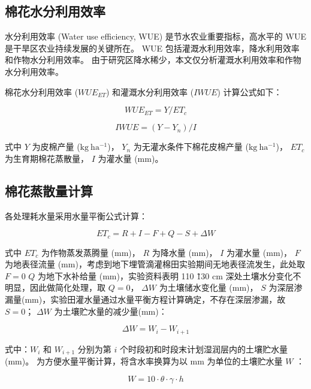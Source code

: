 \subsection{棉花水分利用效率}
水分利用效率 (Water use efficiency, WUE) 是节水农业重要指标，高水平的 WUE 是干旱区农业持续发展的关键所在。
WUE 包括灌溉水利用效率，降水利用效率和作物水分利用效率。
由于研究区降水稀少，本文仅分析灌溉水利用效率和作物水分利用效率。

棉花水分利用效率 ($WUE_{ET}$) 和灌溉水分利用效率 ($IWUE$) 计算公式如下：

\begin{equation}
    WUE_{ET} = Y / ET_c
\end{equation}

\begin{equation}
    IWUE = (Y - Y_n) / I
\end{equation}

式中 $Y$ 为皮棉产量 ($\mathrm{kg\ ha^{-1}}$)，
$Y_n$ 为无灌水条件下棉花皮棉产量 ($\mathrm{kg\ ha^{-1}}$)，
$ET_c$ 为生育期棉花蒸散量，
$I$ 为灌水量 (mm)。
\subsection{棉花蒸散量计算}

各处理耗水量采用水量平衡公式计算：

\begin{equation}
    ET_c = R + I - F + Q - S + \Delta W
\end{equation}

式中 $ET_c$ 为作物蒸发蒸腾量 (mm)，
$R$ 为降水量 (mm)，
$I$ 为灌水量 (mm)，
$F$ 为地表径流量 (mm)，考虑到地下埋管滴灌棉田实验期间无地表径流发生，此处取 $F = 0$
$Q$ 为地下水补给量 (mm)，实验资料表明 110 \~ 130 cm 深处土壤水分变化不明显，因此做简化处理，取 $Q = 0$，
$\Delta W$ 为土壤储水变化量 (mm)，
$S$ 为深层渗漏量(mm)，实验田灌水量通过水量平衡方程计算确定，不存在深层渗漏，故 $S=0$；
$\Delta W$ 为土壤贮水量的减少量(mm)：

\begin{equation}
    \Delta W = W_i - W_{i+1}
\end{equation}

式中：$W_i$ 和 $W_{i+1}$ 分别为第 $i$ 个时段初和时段末计划湿润层内的土壤贮水量 (mm)。
为方便水量平衡计算，将含水率换算为以 mm 为单位的土壤贮水量 $W$ ：

\begin{equation}
    W = 10 \cdot \theta \cdot \gamma \cdot h
\end{equation}

